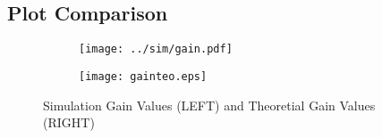 \vspace{2cm}


\subsection{Plot Comparison}

\vspace{-3cm}

\begin{figure}[ht]
\centering
\begin{subfigure}{.5\textwidth}
  \centering
  \texttt{[image: ../sim/gain.pdf]}
\end{subfigure}%
\begin{subfigure}{.5\textwidth}
  \centering
  \vspace{3cm}
  \texttt{[image: gainteo.eps]}
\end{subfigure}
\caption{Simulation Gain Values (LEFT) and Theoretial Gain Values (RIGHT)}
\label{fig:sbs3}
\end{figure}



